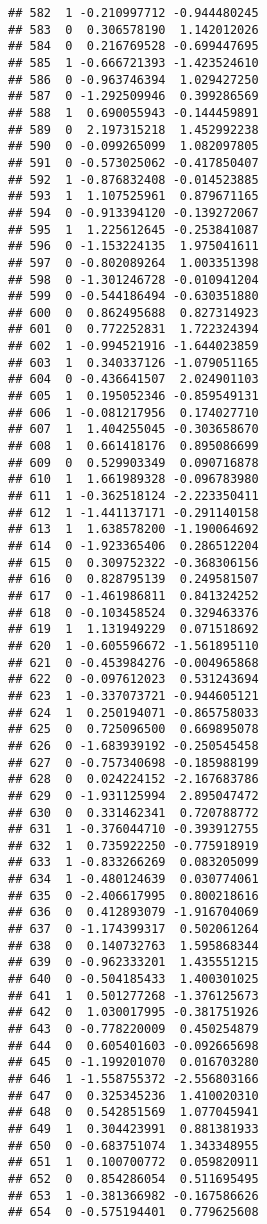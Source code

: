 \documentclass[
]{article}
\begin{document}
\begin{verbatim}
## 582  1 -0.210997712 -0.944480245
## 583  0  0.306578190  1.142012026
## 584  0  0.216769528 -0.699447695
## 585  1 -0.666721393 -1.423524610
## 586  0 -0.963746394  1.029427250
## 587  0 -1.292509946  0.399286569
## 588  1  0.690055943 -0.144459891
## 589  0  2.197315218  1.452992238
## 590  0 -0.099265099  1.082097805
## 591  0 -0.573025062 -0.417850407
## 592  1 -0.876832408 -0.014523885
## 593  1  1.107525961  0.879671165
## 594  0 -0.913394120 -0.139272067
## 595  1  1.225612645 -0.253841087
## 596  0 -1.153224135  1.975041611
## 597  0 -0.802089264  1.003351398
## 598  0 -1.301246728 -0.010941204
## 599  0 -0.544186494 -0.630351880
## 600  0  0.862495688  0.827314923
## 601  0  0.772252831  1.722324394
## 602  1 -0.994521916 -1.644023859
## 603  1  0.340337126 -1.079051165
## 604  0 -0.436641507  2.024901103
## 605  1  0.195052346 -0.859549131
## 606  1 -0.081217956  0.174027710
## 607  1  1.404255045 -0.303658670
## 608  1  0.661418176  0.895086699
## 609  0  0.529903349  0.090716878
## 610  1  1.661989328 -0.096783980
## 611  1 -0.362518124 -2.223350411
## 612  1 -1.441137171 -0.291140158
## 613  1  1.638578200 -1.190064692
## 614  0 -1.923365406  0.286512204
## 615  0  0.309752322 -0.368306156
## 616  0  0.828795139  0.249581507
## 617  0 -1.461986811  0.841324252
## 618  0 -0.103458524  0.329463376
## 619  1  1.131949229  0.071518692
## 620  1 -0.605596672 -1.561895110
## 621  0 -0.453984276 -0.004965868
## 622  0 -0.097612023  0.531243694
## 623  1 -0.337073721 -0.944605121
## 624  1  0.250194071 -0.865758033
## 625  0  0.725096500  0.669895078
## 626  0 -1.683939192 -0.250545458
## 627  0 -0.757340698 -0.185988199
## 628  0  0.024224152 -2.167683786
## 629  0 -1.931125994  2.895047472
## 630  0  0.331462341  0.720788772
## 631  1 -0.376044710 -0.393912755
## 632  1  0.735922250 -0.775918919
## 633  1 -0.833266269  0.083205099
## 634  1 -0.480124639  0.030774061
## 635  0 -2.406617995  0.800218616
## 636  0  0.412893079 -1.916704069
## 637  0 -1.174399317  0.502061264
## 638  0  0.140732763  1.595868344
## 639  0 -0.962333201  1.435551215
## 640  0 -0.504185433  1.400301025
## 641  1  0.501277268 -1.376125673
## 642  0  1.030017995 -0.381751926
## 643  0 -0.778220009  0.450254879
## 644  0  0.605401603 -0.092665698
## 645  0 -1.199201070  0.016703280
## 646  1 -1.558755372 -2.556803166
## 647  0  0.325345236  1.410020310
## 648  0  0.542851569  1.077045941
## 649  1  0.304423991  0.881381933
## 650  0 -0.683751074  1.343348955
## 651  1  0.100700772  0.059820911
## 652  0  0.854286054  0.511695495
## 653  1 -0.381366982 -0.167586626
## 654  0 -0.575194401  0.779625608

\end{verbatim}
\end{document}
